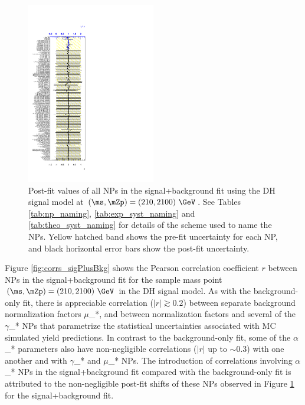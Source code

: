 \begin{figure}[h]
  \centering
  \includegraphics[width=0.5\textwidth]{Figures/8/MonoSlep_monoSWWsemilep_zp2100_dm200_dh210/fit_parameters.pdf}
  \caption[Pull plots for blinded SRs]{\footnotesize{Post-fit values of all NPs in the signal+background fit using the DH signal model at \((\ms, \mZp) = (210, 2100)~\GeV\). See Tables \ref{tab:np_naming}, \ref{tab:exp_syst_naming} and \ref{tab:theo_syst_naming} for details of the scheme used to name the NPs. Yellow hatched band shows the pre-fit uncertainty for each NP, and black horizontal error bars show the post-fit uncertainty.}}
  \label{fig:pull_sigPlusBkg}
\end{figure}

Figure \ref{fig:corrs_sigPlusBkg} shows the Pearson correlation coefficient \(r\) between NPs in the signal+background fit for the sample mass point \((\ms, \mZp) = (210, 2100)~\GeV\) in the DH signal model. As with the background-only fit, there is appreciable correlation (\(|r|\gtrsim0.2\)) between separate background normalization factors \(\mu\)\_*, and between normalization factors and several of the \(\gamma\)\_* NPs that parametrize the statistical uncertainties associated with MC simulated yield predictions. In contrast to the background-only fit, some of the \(\alpha\)\_* parameters also have non-negligible correlations (\(|r|\) up to \(\sim0.3\)) with one another and with \(\gamma\)\_* and \(\mu\)\_* NPs. The introduction of correlations involving \(\alpha\)\_* NPs in the signal+background fit compared with the background-only fit is attributed to the non-negligible post-fit shifts of these NPs observed in Figure \ref{fig:pull_sigPlusBkg} for the signal+background fit.

